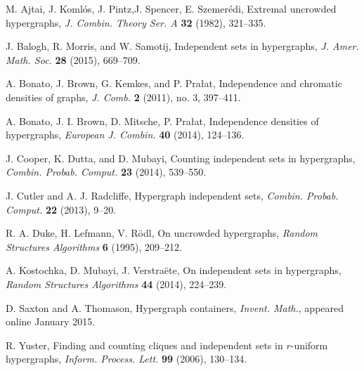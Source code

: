 \documentclass[11pt,reqno]{amsart}
\theoremstyle{definition}
\begin{document}
\begin{thebibliography}{99}

M. Ajtai, J. Koml\'{o}s, J. Pintz,J. Spencer, E. Szemer\'{e}di, Extremal uncrowded hypergraphs, \emph{J. Combin. Theory Ser. A} \textbf{32} (1982), 321--335.

J. Balogh, R. Morris, and W. Samotij, Independent sets in hypergraphs, \emph{J. Amer. Math. Soc.} \textbf{28} (2015), 669--709.
	
A. Bonato, J. Brown, G. Kemkes, and P. Pra{\l}at, Independence and chromatic densities of graphs, \emph{J. Comb.} \textbf{2} (2011), no. 3, 397--411.
	
A. Bonato, J. I. Brown, D. Mitsche, P. Pra{\l}at, Independence densities of hypergraphs, \emph{European J. Combin.} \textbf{40} (2014), 124--136.
	
J. Cooper, K. Dutta, and D. Mubayi, Counting independent sets in hypergraphs, \emph{Combin. Probab. Comput.} \textbf{23} (2014), 539--550.

J. Cutler and A. J. Radcliffe, Hypergraph independent sets, \emph{Combin. Probab. Comput.} \textbf{22} (2013), 9--20.

R. A. Duke, H. Lefmann, V. R\"{o}dl, On uncrowded hypergraphs, \emph{Random Structures Algorithms} \textbf{6} (1995), 209--212.

A. Kostochka, D. Mubayi, J. Verstra\"{e}te, On independent sets in hypergraphs, \emph{Random Structures Algorithms} \textbf{44} (2014), 224--239.
	
D. Saxton and A. Thomason, Hypergraph containers, \emph{Invent. Math.}, appeared online January 2015.
	
R. Yuster, Finding and counting cliques and independent sets in $r$-uniform hypergraphs, \emph{Inform. Process. Lett.} \textbf{99} (2006), 130--134.

\end{thebibliography}

	
\end{document}
